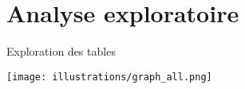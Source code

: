 \documentclass[10pt]{beamer}
\begin{document}
\section{Analyse exploratoire}
\begin{frame}{Exploration des tables}
       \begin{center}
           \texttt{[image: illustrations/graph\_all.png]}
       \end{center}
\end{frame}
\end{document}
